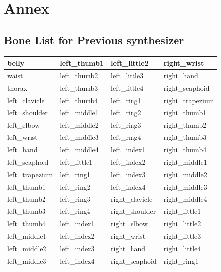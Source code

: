 \documentclass[../main.tex]{subfiles}
\begin{document}
\appendix
\renewcommand{\thesection}{\Alph{section}}
\renewcommand{\thesubsection}{\thesection.\arabic{subsection}}

\section{Annex}
\label{annex}

\subsection{Bone List for Previous synthesizer}
\label{annex:background_work:old_bone_list}

\begin{longtable}{|l|l|l|l|}
    \hline
    belly & left\_thumb1 & left\_little2 & right\_wrist \\ \hline
    waist & left\_thumb2 & left\_little3 & right\_hand \\ \hline
    thorax & left\_thumb3 & left\_little4 & right\_scaphoid \\ \hline
    left\_clavicle & left\_thumb4 & left\_ring1 & right\_trapezium \\ \hline
    left\_shoulder & left\_middle1 & left\_ring2 & right\_thumb1 \\ \hline
    left\_elbow & left\_middle2 & left\_ring3 & right\_thumb2 \\ \hline
    left\_wrist & left\_middle3 & left\_ring4 & right\_thumb3 \\ \hline
    left\_hand & left\_middle4 & left\_index1 & right\_thumb4 \\ \hline
    left\_scaphoid & left\_little1 & left\_index2 & right\_middle1 \\ \hline
    left\_trapezium & left\_ring1 & left\_index3 & right\_middle2 \\ \hline
    left\_thumb1 & left\_ring2 & left\_index4 & right\_middle3 \\ \hline
    left\_thumb2 & left\_ring3 & right\_clavicle & right\_middle4 \\ \hline
    left\_thumb3 & left\_ring4 & right\_shoulder & right\_little1 \\ \hline
    left\_thumb4 & left\_index1 & right\_elbow & right\_little2 \\ \hline
    left\_middle1 & left\_index2 & right\_wrist & right\_little3 \\ \hline
    left\_middle2 & left\_index3 & right\_hand & right\_little4 \\ \hline
    left\_middle3 & left\_index4 & right\_scaphoid & right\_ring1 \\ \hline

\end{longtable}
\end{document}

